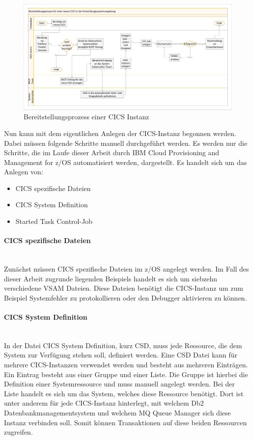 \begin{figure}[ht!]
\centering
\includegraphics[width=\paperwidth,angle=90]{figures/swimlaneCICS.pdf}
\caption{Bereitstellungsprozess einer CICS Instanz}
\label{fig:aktcics}
\end{figure}

Nun kann mit dem eigentlichen Anlegen der CICS-Instanz begonnen werden.
Dabei müssen folgende Schritte manuell durchgeführt werden.
Es werden nur die Schritte, die im Laufe dieser Arbeit durch \glqq IBM Cloud Provisioning and Management for z/OS\grqq{} automatisiert werden, dargestellt.
Es handelt sich um das Anlegen von:

\begin{itemize}
\item CICS spezifische Dateien
\item \glqq CICS System Definition\grqq
\item Started Task Control-Job
\end{itemize}

\paragraph{CICS spezifische Dateien}\label{sssec:speziDat} ~\\
Zunächst müssen CICS spezifische Dateien im z/OS angelegt werden.
Im Fall des dieser Arbeit zugrunde liegenden Beispiels handelt es sich um siebzehn verschiedene VSAM Dateien.
Diese Dateien benötigt die CICS-Instanz um zum Beispiel Systemfehler zu protokollieren oder den Debugger aktivieren zu können.

\paragraph{\glqq CICS System Definition\grqq} ~\\
In der Datei \glqq CICS System Definition\grqq, kurz CSD, muss jede Ressource, die dem System zur Verfügung stehen soll, definiert werden.
Eine CSD Datei kann für mehrere CICS-Instanzen verwendet werden und besteht aus mehreren Einträgen.
Ein Eintrag besteht aus einer Gruppe und einer Liste.
Die Gruppe ist hierbei die Definition einer Systemressource und muss manuell angelegt werden.
Bei der Liste handelt es sich um das System, welches diese Ressource benötigt.
Dort ist unter anderem für jede CICS-Instanz hinterlegt, mit welchem Db2 Datenbankmanagementsystem und welchem MQ Queue Manager sich diese Instanz verbinden soll.
Somit können Transaktionen auf diese beiden Ressourcen zugreifen.

